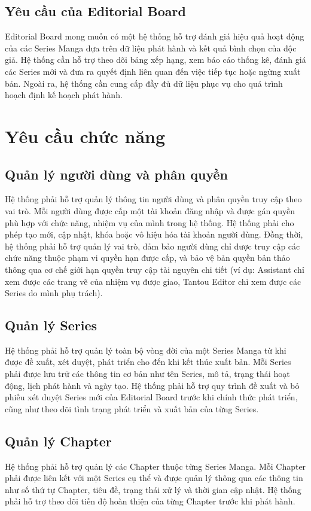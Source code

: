 \subsection{Yêu cầu của Editorial Board}
\label{subsec:yeu_cau_editorial_board}
Editorial Board mong muốn có một hệ thống hỗ trợ đánh giá hiệu quả hoạt động của các Series Manga dựa trên dữ liệu phát hành và kết quả bình chọn của độc giả. Hệ thống cần hỗ trợ theo dõi bảng xếp hạng, xem báo cáo thống kê, đánh giá các Series mới và đưa ra quyết định liên quan đến việc tiếp tục hoặc ngừng xuất bản. Ngoài ra, hệ thống cần cung cấp đầy đủ dữ liệu phục vụ cho quá trình hoạch định kế hoạch phát hành.

\section{Yêu cầu chức năng}
\label{sec:yeu_cau_chuc_nang}

\subsection{Quản lý người dùng và phân quyền}
Hệ thống phải hỗ trợ quản lý thông tin người dùng và phân quyền truy cập theo vai trò. Mỗi người dùng được cấp một tài khoản đăng nhập và được gán quyền phù hợp với chức năng, nhiệm vụ của mình trong hệ thống. Hệ thống phải cho phép tạo mới, cập nhật, khóa hoặc vô hiệu hóa tài khoản người dùng. Đồng thời, hệ thống phải hỗ trợ quản lý vai trò, đảm bảo người dùng chỉ được truy cập các chức năng thuộc phạm vi quyền hạn được cấp, và bảo vệ bản quyền bản thảo thông qua cơ chế giới hạn quyền truy cập tài nguyên chi tiết (ví dụ: Assistant chỉ xem được các trang vẽ của nhiệm vụ được giao, Tantou Editor chỉ xem được các Series do mình phụ trách).

\subsection{Quản lý Series}
Hệ thống phải hỗ trợ quản lý toàn bộ vòng đời của một Series Manga từ khi được đề xuất, xét duyệt, phát triển cho đến khi kết thúc xuất bản. Mỗi Series phải được lưu trữ các thông tin cơ bản như tên Series, mô tả, trạng thái hoạt động, lịch phát hành và ngày tạo. Hệ thống phải hỗ trợ quy trình đề xuất và bỏ phiếu xét duyệt Series mới của Editorial Board trước khi chính thức phát triển, cũng như theo dõi tình trạng phát triển và xuất bản của từng Series.

\subsection{Quản lý Chapter}
Hệ thống phải hỗ trợ quản lý các Chapter thuộc từng Series Manga. Mỗi Chapter phải được liên kết với một Series cụ thể và được quản lý thông qua các thông tin như số thứ tự Chapter, tiêu đề, trạng thái xử lý và thời gian cập nhật. Hệ thống phải hỗ trợ theo dõi tiến độ hoàn thiện của từng Chapter trước khi phát hành.

